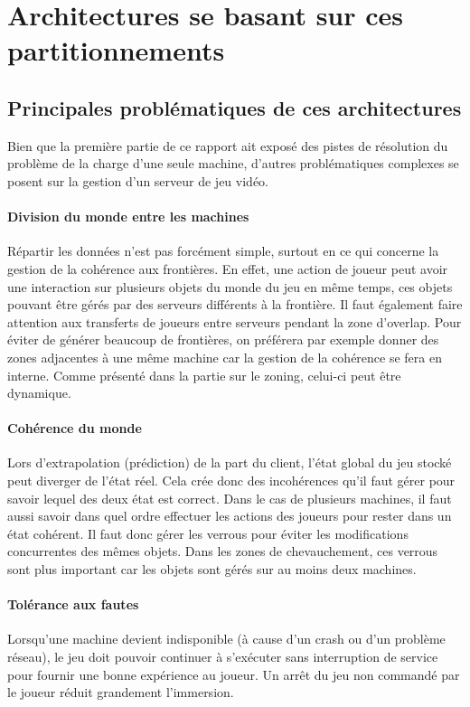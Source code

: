 \section{Architectures se basant sur ces partitionnements}

\subsection{Principales problématiques de ces architectures}
Bien que la première partie de ce rapport ait exposé des pistes de résolution du problème de la charge d'une seule machine, d'autres problématiques complexes se posent sur la gestion d'un serveur de jeu vidéo.

\paragraph{Division du monde entre les machines\\}
Répartir les données n'est pas forcément simple, surtout en ce qui concerne la gestion de la cohérence aux frontières. En effet, une action de joueur peut avoir une interaction sur plusieurs objets du monde du jeu en même temps, ces objets pouvant être gérés par des serveurs différents à la frontière. Il faut également faire attention aux transferts de joueurs entre serveurs pendant la zone d'overlap. Pour éviter de générer beaucoup de frontières, on préférera par exemple donner des zones adjacentes à une même machine car la gestion de la cohérence se fera en interne. Comme présenté dans la partie sur le zoning, celui-ci peut être dynamique. 

\paragraph{Cohérence du monde\\}
Lors d'extrapolation (prédiction) de la part du client, l'état global du jeu stocké peut diverger de l'état réel. Cela crée donc des incohérences qu'il faut gérer pour savoir lequel des deux état est correct. Dans le cas de plusieurs machines, il faut aussi savoir dans quel ordre effectuer les actions des joueurs pour rester dans un état cohérent. Il faut donc gérer les verrous pour éviter les modifications concurrentes des mêmes objets. Dans les zones de chevauchement, ces verrous sont plus important car les objets sont gérés sur au moins deux machines.

\paragraph{Tolérance aux fautes\\}
Lorsqu'une machine devient indisponible (à cause d'un crash ou d'un problème réseau), le jeu doit pouvoir continuer à s'exécuter sans interruption de service pour fournir une bonne expérience au joueur. Un arrêt du jeu non commandé par le joueur réduit grandement l'immersion.

